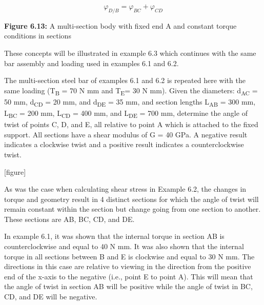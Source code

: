 \documentclass[
  letterpaper,
  DIV=11,
  numbers=noendperiod]{scrreprt}
\begin{document}
\[
\varphi_{D / B}=\varphi_{B C}+\varphi_{C D}
\]

\textbf{Figure 6.13:} A multi-section body with fixed end A and constant
torque conditions in sections

These concepts will be illustrated in example 6.3 which continues with
the same bar assembly and loading used in examples 6.1 and 6.2.

\begin{tcolorbox}[enhanced jigsaw, breakable, opacityback=0, toptitle=1mm, left=2mm, colback=white, opacitybacktitle=0.6, colframe=quarto-callout-note-color-frame, titlerule=0mm, arc=.35mm, leftrule=.75mm, bottomtitle=1mm, colbacktitle=quarto-callout-note-color!10!white, rightrule=.15mm, title={Example 6.3}, bottomrule=.15mm, toprule=.15mm, coltitle=black]

The multi-section steel bar of examples 6.1 and 6.2 is repeated here
with the same loading (T\textsubscript{B} = 70 N mm and
T\textsubscript{E}= 30 N mm). Given the diameters: d\textsubscript{AC} =
50 mm, d\textsubscript{CD} = 20 mm, and d\textsubscript{DE} = 35 mm, and
section lengths L\textsubscript{AB} = 300 mm, L\textsubscript{BC} = 200
mm, L\textsubscript{CD} = 400 mm, and L\textsubscript{DE} = 700 mm,
determine the angle of twist of points C, D, and E, all relative to
point A which is attached to the fixed support. All sections have a
shear modulus of G = 40 GPa. A negative result indicates a clockwise
twist and a positive result indicates a counterclockwise twist.

{[}figure{]}

\begin{tcolorbox}[enhanced jigsaw, breakable, opacityback=0, toptitle=1mm, left=2mm, colback=white, opacitybacktitle=0.6, colframe=quarto-callout-note-color-frame, titlerule=0mm, arc=.35mm, leftrule=.75mm, bottomtitle=1mm, colbacktitle=quarto-callout-note-color!10!white, rightrule=.15mm, title={Solution}, bottomrule=.15mm, toprule=.15mm, coltitle=black]

As was the case when calculating shear stress in Example 6.2, the
changes in torque and geometry result in 4 distinct sections for which
the angle of twist will remain constant within the section but change
going from one section to another. These sections are AB, BC, CD, and
DE.

In example 6.1, it was shown that the internal torque in section AB is
counterclockwise and equal to 40 N mm. It was also shown that the
internal torque in all sections between B and E is clockwise and equal
to 30 N mm. The directions in this case are relative to viewing in the
direction from the positive end of the x-axis to the negative (i.e.,
point E to point A). This will mean that the angle of twist in section
AB will be positive while the angle of twist in BC, CD, and DE will be
negative.


\end{tcolorbox}
\end{tcolorbox}
\end{document}
